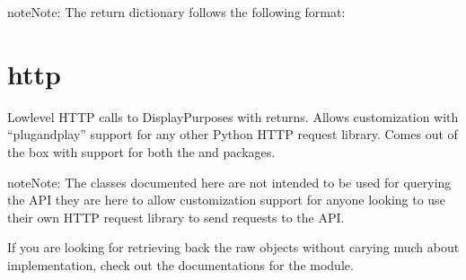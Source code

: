 \documentclass[letterpaper,10pt,english,openany,oneside]{sphinxmanual}
\begin{document}
\begin{fulllineitems}
\begin{quote}
\begin{description}
\end{description}\end{quote}

\begin{sphinxadmonition}{note}{Note:}
The return dictionary follows the following format:

\begin{sphinxVerbatim}[commandchars=\\\{\}]
     
     \PYG{p}{[}
             \PYG{p}{[}
                 
                 
            \PYG{p}{]}
             
             
    \PYG{p}{]}
\end{sphinxVerbatim}
\end{sphinxadmonition}

\end{fulllineitems}



\chapter{http}
\label{\detokenize{source/http:http}}\label{\detokenize{source/http::doc}}
\begin{sphinxVerbatim}[commandchars=\\\{\}]
     
\end{sphinxVerbatim}

Low\sphinxhyphen{}level HTTP calls to DisplayPurposes with  returns. Allows customization with
“plug\sphinxhyphen{}and\sphinxhyphen{}play” support for any other Python HTTP request library. Comes out of the box
with support for both the   and  packages.

\begin{sphinxadmonition}{note}{Note:}
The classes documented here are not intended to be used for querying the API\sphinxhyphen{} they are here
to allow customization support for anyone looking to use their own HTTP request library to
send requests to the API.

If you are looking for retrieving back the raw  objects without carying much about
implementation, check out the documentations for the {\hyperref[\detokenize{source/api:api}]{}} module.
\end{sphinxadmonition}
\end{document}
